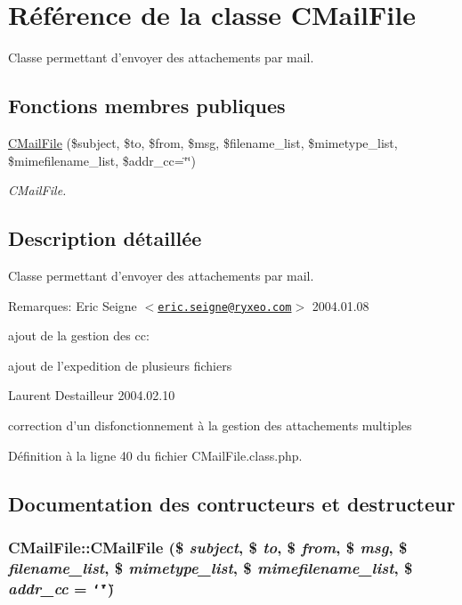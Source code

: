 \hypertarget{classCMailFile}{
\section{R\'{e}f\'{e}rence de la classe CMail\-File}
\label{classCMailFile}
}
Classe permettant d'envoyer des attachements par mail.  


\subsection*{Fonctions membres publiques}
\begin{CompactItemize}
\item 
\hyperlink{classCMailFile_a0}{CMail\-File} (\$subject, \$to, \$from, \$msg, \$filename\_\-list, \$mimetype\_\-list, \$mimefilename\_\-list, \$addr\_\-cc=\char`\"{}\char`\"{})
\begin{CompactList}\small\item\em CMail\-File. \item\end{CompactList}\end{CompactItemize}


\subsection{Description d\'{e}taill\'{e}e}
Classe permettant d'envoyer des attachements par mail. 

\begin{Desc}
\item[Remarques:]Eric Seigne $<$\href{mailto:eric.seigne@ryxeo.com}{\tt eric.seigne@ryxeo.com}$>$ 2004.01.08 

ajout de la gestion des cc: 

ajout de l'expedition de plusieurs fichiers

Laurent Destailleur 2004.02.10 

correction d'un disfonctionnement \`{a} la gestion des attachements multiples \end{Desc}




D\'{e}finition \`{a} la ligne 40 du fichier CMail\-File.class.php.

\subsection{Documentation des contructeurs et destructeur}
\hypertarget{classCMailFile_a0}{
\subsubsection[CMailFile]{\setlength{\rightskip}{0pt plus 5cm}CMail\-File::CMail\-File (\$ {\em subject}, \$ {\em to}, \$ {\em from}, \$ {\em msg}, \$ {\em filename\_\-list}, \$ {\em mimetype\_\-list}, \$ {\em mimefilename\_\-list}, \$ {\em addr\_\-cc} = {\tt \char`\"{}\char`\"{}})}}
\label{classCMailFile_a0}



